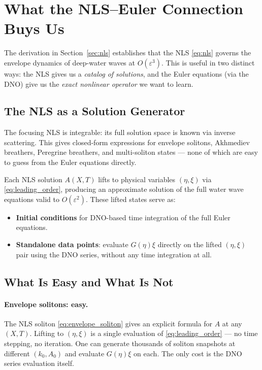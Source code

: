 \documentclass[11pt]{article}
\newcommand{\eps}{\varepsilon}
\begin{document}
\section{What the NLS--Euler Connection Buys Us}
\label{sec:connection}

The derivation in Section~\ref{sec:nls} establishes that the NLS
\eqref{eq:nls} governs the envelope dynamics of deep-water waves
at $O(\eps^3)$.
This is useful in two distinct ways: the NLS gives us a
\emph{catalog of solutions}, and the Euler equations (via the DNO)
give us the \emph{exact nonlinear operator} we want to learn.

\subsection{The NLS as a Solution Generator}

The focusing NLS is integrable: its full solution space is known
via inverse scattering.
This gives closed-form expressions for envelope solitons, Akhmediev
breathers, Peregrine breathers, and multi-soliton states ---
none of which are easy to guess from the Euler equations directly.

Each NLS solution $A(X,T)$ lifts to physical variables $(\eta,\xi)$
via \eqref{eq:leading_order}, producing an approximate solution of the
full water wave equations valid to $O(\eps^2)$.
These lifted states serve as:
\begin{itemize}
\item \textbf{Initial conditions} for DNO-based time integration of the
full Euler equations.
\item \textbf{Standalone data points}: evaluate $G(\eta)\xi$ directly
on the lifted $(\eta,\xi)$ pair using the DNO series, without any
time integration at all.
\end{itemize}

\subsection{What Is Easy and What Is Not}

\paragraph{Envelope solitons: easy.}
The NLS soliton \eqref{eq:envelope_soliton} gives an explicit formula
for $A$ at any $(X,T)$.
Lifting to $(\eta,\xi)$ is a single evaluation of
\eqref{eq:leading_order} --- no time stepping, no iteration.
One can generate thousands of soliton snapshots at different $(k_0, A_0)$
and evaluate $G(\eta)\xi$ on each.
The only cost is the DNO series evaluation itself.
\end{document}
